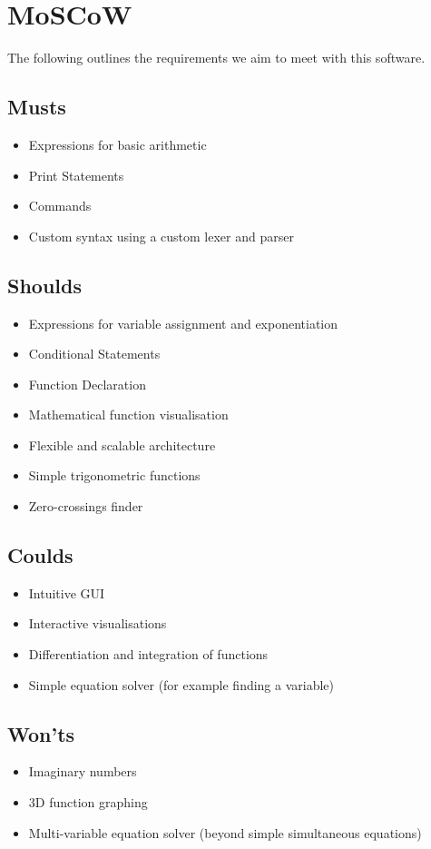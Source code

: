 \documentclass[a4paper, oneside, 11pt]{report}
\begin{document}
\section{MoSCoW}
The following outlines the requirements we aim to meet with this software.

\subsection{Musts}

\begin{itemize}
	\item Expressions for basic arithmetic
	\item Print Statements
	\item Commands
	\item Custom syntax using a custom lexer and parser
\end{itemize}

\subsection{Shoulds}

\begin{itemize}
	\item Expressions for variable assignment and exponentiation
	\item Conditional Statements
	\item Function Declaration
	\item Mathematical function visualisation
	\item Flexible and scalable architecture
	\item Simple trigonometric functions
	\item Zero-crossings finder
\end{itemize}

\subsection{Coulds}
\begin{itemize}
	\item Intuitive GUI
	\item Interactive visualisations
	\item Differentiation and integration of functions
	\item Simple equation solver (for example finding a variable)
\end{itemize}

\subsection{Won'ts}
\begin{itemize}
	\item Imaginary numbers
	\item 3D function graphing
	\item Multi-variable equation solver (beyond simple simultaneous equations)
\end{itemize}
\end{document}
